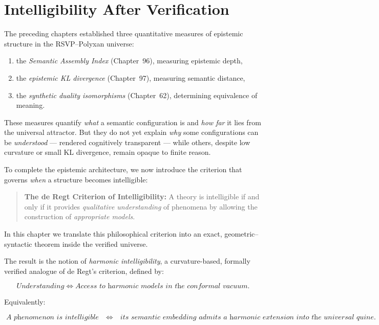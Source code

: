 \chapter{Intelligibility After Verification}

The preceding chapters established three quantitative measures of epistemic
structure in the RSVP--Polyxan universe:

\begin{enumerate}
\item the \emph{Semantic Assembly Index} (Chapter~96), measuring epistemic depth,
\item the \emph{epistemic KL divergence} (Chapter~97), measuring semantic distance,
\item the \emph{synthetic duality isomorphisms} (Chapter~62), determining equivalence of meaning.
\end{enumerate}

These measures quantify \emph{what} a semantic configuration is and \emph{how far}
it lies from the universal attractor.  
But they do not yet explain \emph{why} some configurations can be
\emph{understood} --- rendered cognitively transparent --- while others,
despite low curvature or small KL divergence, remain opaque to finite reason.

To complete the epistemic architecture, we now introduce the criterion that
governs \emph{when} a structure becomes intelligible:

\begin{quote}
\textbf{The de Regt Criterion of Intelligibility:}  
A theory is intelligible if and only if it provides
\emph{qualitative understanding} of phenomena by allowing the construction
of \emph{appropriate models}.
\end{quote}

In this chapter we translate this philosophical criterion into an exact,
geometric--syntactic theorem inside the verified universe.

The result is the notion of \emph{harmonic intelligibility},
a curvature-based, formally verified analogue of de Regt’s criterion, defined by:

\[
\textit{Understanding} \;\Longleftrightarrow\;
\textit{Access to harmonic models in the conformal vacuum.}
\]

Equivalently:

\[
\textit{A phenomenon is intelligible} 
\quad\Longleftrightarrow\quad
\textit{its semantic embedding admits a harmonic extension into the universal quine.}
\]

